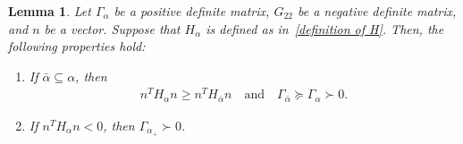 \documentclass{article}
\newtheorem{lemma}{Lemma}
\begin{document}
	\begin{lemma}\label{lemma positive}
		Let $\Gamma_{\alpha}$ be a positive definite matrix, $G_{22}$ be a negative definite matrix, and $n$ be a vector. Suppose that $H_{\alpha}$ is defined as in~\eqref{definition of H}. Then, the following properties hold:
		\begin{enumerate}
			\item If $\bar{\alpha} \subseteq \alpha$, then
			\begin{align}
				n^{T}H_{\alpha}n \geq n^{T}H_{\bar{\alpha}}n
				\quad\text{and}\quad
				\Gamma_{\bar{\alpha}} \succeq \Gamma_{\alpha} \succ 0.
			\end{align}
			\item If $n^{T}H_{\alpha}n < 0$, then $\Gamma_{\alpha_{+}} \succ 0$.
		\end{enumerate}
	\end{lemma}
	
\end{document}
